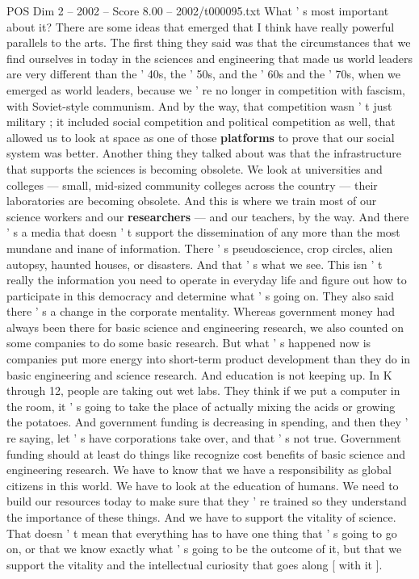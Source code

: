 \begin{textsample}{POS Dim 2 – 2002 – Score 8.00 – 2002/t000095.txt}
What ' s most important about it?
There are some ideas that emerged that I think have really powerful parallels to the arts.
The first thing they said was that the circumstances that we find ourselves in today in the sciences and engineering that made us world leaders are very different than the ' 40s, the ' 50s, and the ' 60s and the ' 70s, when we emerged as world leaders, because we ' re no longer in competition with fascism, with Soviet-style communism.
And by the way, that competition wasn ' t just military ; it included social competition and political competition as well, that allowed us to look at space as one of those \textbf{platforms} to prove that our social system was better.
Another thing they talked about was that the infrastructure that supports the sciences is becoming obsolete.
We look at universities and colleges — small, mid-sized community colleges across the country — their laboratories are becoming obsolete.
And this is where we train most of our science workers and our \textbf{researchers} — and our teachers, by the way.
And there ' s a media that doesn ' t support the dissemination of any more than the most mundane and inane of information.
There ' s pseudoscience, crop circles, alien autopsy, haunted houses, or disasters.
And that ' s what we see.
This isn ' t really the information you need to operate in everyday life and figure out how to participate in this democracy and determine what ' s going on.
They also said there ' s a change in the corporate mentality.
Whereas government money had always been there for basic science and engineering research, we also counted on some companies to do some basic research.
But what ' s happened now is companies put more energy into short-term product development than they do in basic engineering and science research.
And education is not keeping up.
In K through 12, people are taking out wet labs.
They think if we put a computer in the room, it ' s going to take the place of actually mixing the acids or growing the potatoes.
And government funding is decreasing in spending, and then they ' re saying, let ' s have corporations take over, and that ' s not true.
Government funding should at least do things like recognize cost benefits of basic science and engineering research.
We have to know that we have a responsibility as global citizens in this world.
We have to look at the education of humans.
We need to build our resources today to make sure that they ' re trained so they understand the importance of these things.
And we have to support the vitality of science.
That doesn ' t mean that everything has to have one thing that ' s going to go on, or that we know exactly what ' s going to be the outcome of it, but that we support the vitality and the intellectual curiosity that goes along [ with it ].

\end{textsample}
